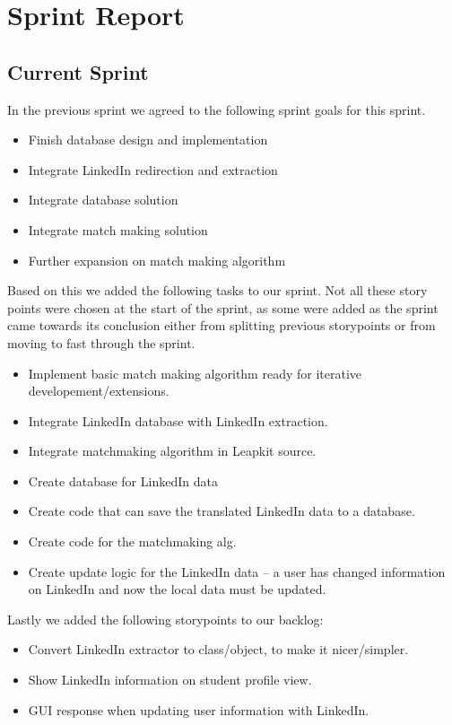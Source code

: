\section{Sprint Report}

\subsection{Current Sprint}

In the previous sprint we agreed to the following sprint goals for this sprint. 
\begin{itemize}
    \item Finish database design and implementation
    \item Integrate LinkedIn redirection and extraction
    \item Integrate database solution
    \item Integrate match making solution
    \item Further expansion on match making algorithm
\end{itemize}
Based on this we added the following tasks to our sprint. Not all these story points were chosen at the start of the 
sprint, as some were added as the sprint came towards its conclusion either from splitting previous storypoints or 
from moving to fast through the sprint.
\begin{itemize}
    \item Implement basic match making algorithm ready for iterative developement/extensions.
    \item Integrate LinkedIn database with LinkedIn extraction. 
    \item Integrate matchmaking algorithm in Leapkit source.
    \item Create database for LinkedIn data
    \item Create code that can save the translated LinkedIn data to a database.
    \item Create code for the matchmaking alg.
    \item Create update logic for the LinkedIn data -- a user has changed information on LinkedIn and now the local data must be updated.
\end{itemize}
Lastly we added the following storypoints to our backlog:
\begin{itemize}
    \item Convert LinkedIn extractor to class/object, to make it nicer/simpler.
    \item Show LinkedIn information on student profile view.
    \item GUI response when updating user information with LinkedIn.
\end{itemize}

